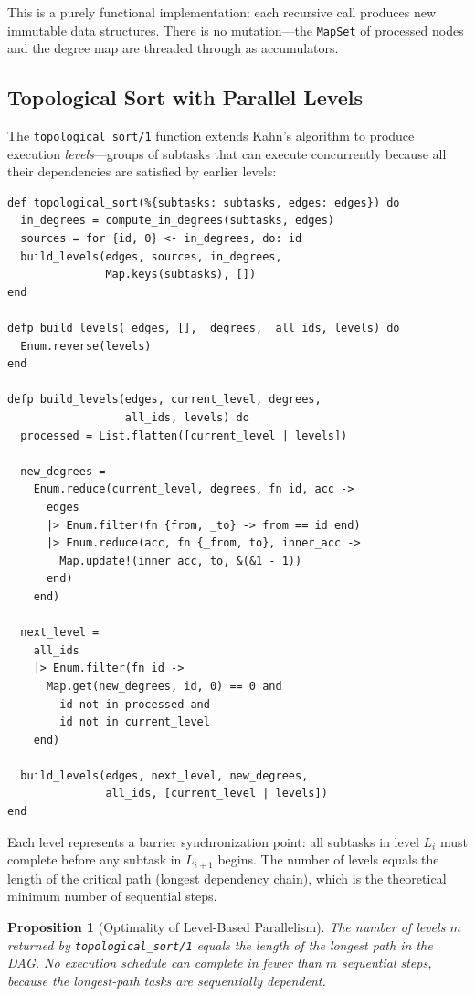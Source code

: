 \documentclass[12pt,a4paper]{article}
\theoremstyle{plain}
\newtheorem{proposition}[theorem]{Proposition}
\theoremstyle{definition}
\begin{document}
This is a purely functional implementation: each recursive call produces new immutable data structures. There is no mutation---the \texttt{MapSet} of processed nodes and the degree map are threaded through as accumulators.

\subsection{Topological Sort with Parallel Levels}

The \texttt{topological\_sort/1} function extends Kahn's algorithm to produce execution \emph{levels}---groups of subtasks that can execute concurrently because all their dependencies are satisfied by earlier levels:

\begin{lstlisting}[caption={Topological sort with parallel level detection},label={lst:decomp-topsort}]
def topological_sort(%{subtasks: subtasks, edges: edges}) do
  in_degrees = compute_in_degrees(subtasks, edges)
  sources = for {id, 0} <- in_degrees, do: id
  build_levels(edges, sources, in_degrees,
               Map.keys(subtasks), [])
end

defp build_levels(_edges, [], _degrees, _all_ids, levels) do
  Enum.reverse(levels)
end

defp build_levels(edges, current_level, degrees,
                  all_ids, levels) do
  processed = List.flatten([current_level | levels])

  new_degrees =
    Enum.reduce(current_level, degrees, fn id, acc ->
      edges
      |> Enum.filter(fn {from, _to} -> from == id end)
      |> Enum.reduce(acc, fn {_from, to}, inner_acc ->
        Map.update!(inner_acc, to, &(&1 - 1))
      end)
    end)

  next_level =
    all_ids
    |> Enum.filter(fn id ->
      Map.get(new_degrees, id, 0) == 0 and
        id not in processed and
        id not in current_level
    end)

  build_levels(edges, next_level, new_degrees,
               all_ids, [current_level | levels])
end
\end{lstlisting}

Each level represents a barrier synchronization point: all subtasks in level $L_i$ must complete before any subtask in $L_{i+1}$ begins. The number of levels equals the length of the critical path (longest dependency chain), which is the theoretical minimum number of sequential steps.

\begin{proposition}[Optimality of Level-Based Parallelism]\label{prop:parallel-optimal}
The number of levels $m$ returned by \texttt{topological\_sort/1} equals the length of the longest path in the DAG. No execution schedule can complete in fewer than $m$ sequential steps, because the longest-path tasks are sequentially dependent.
\end{proposition}
\end{document}
